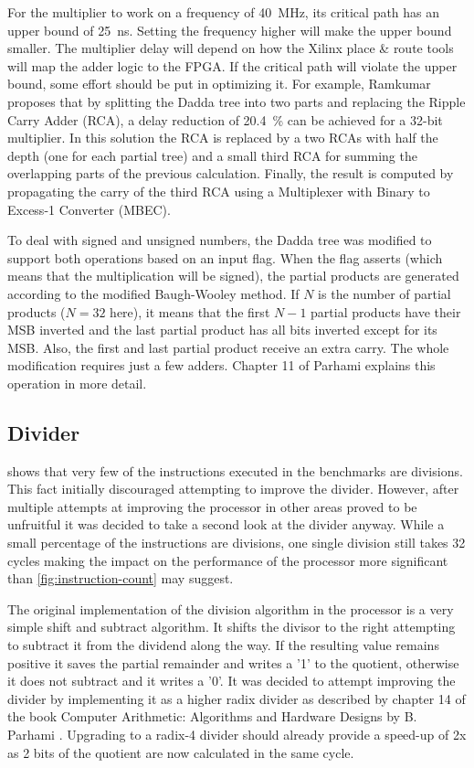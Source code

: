 \documentclass[final]{article}
\begin{document}
For the multiplier to work on a frequency of \SI{40}{\mega\hertz}, its critical path has an upper bound of \SI{25}{\nano\second}. Setting the frequency higher will make the upper bound smaller. The multiplier delay will depend on how the Xilinx place \& route tools will map the adder logic to the FPGA. If the critical path will violate the upper bound, some effort should be put in optimizing it. For example, Ramkumar \cite{ramkumar} proposes that by splitting the Dadda tree into two parts and replacing the Ripple Carry Adder (RCA), a delay reduction of \SI{20.4}{\percent} can be achieved for a 32-bit multiplier. In this solution the RCA is replaced by a two RCAs with half the depth (one for each partial tree) and a small third RCA for summing the overlapping parts of the previous calculation. Finally, the result is computed by propagating the carry of the third RCA using a Multiplexer with Binary to Excess-1 Converter (MBEC).

To deal with signed and unsigned numbers, the Dadda tree was modified to support both operations based on an input flag. When the flag asserts (which means that the multiplication will be signed), the partial products are generated according to the modified Baugh-Wooley method. If $N$ is the number of partial products ($N=32$ here), it means that the first $N-1$ partial products have their MSB inverted and the last partial product has all bits inverted except for its MSB. Also, the first and last partial product receive an extra carry. The whole modification requires just a few adders. Chapter 11 of Parhami \cite{parhami} explains this operation in more detail.

\subsection{Divider}
 shows that very few of the instructions executed in the benchmarks are divisions. This fact initially discouraged attempting to improve the divider. However, after multiple attempts at improving the processor in other areas proved to be unfruitful it was decided to take a second look at the divider anyway. While a small percentage of the instructions are divisions, one single division still takes 32 cycles making the impact on the performance of the processor more significant than \cref{fig:instruction-count} may suggest. 

The original implementation of the division algorithm in the processor is a very simple shift and subtract algorithm. It shifts the divisor to the right attempting to subtract it from the dividend along the way. If the resulting value remains positive it saves the partial remainder and writes a '1' to the quotient, otherwise it does not subtract and it writes a '0'. It was decided to attempt improving the divider by implementing it as a higher radix divider as described by chapter 14 of the book Computer Arithmetic: Algorithms and Hardware Designs by B. Parhami \cite{parhami}. Upgrading to a radix-4 divider should already provide a speed-up of 2x as 2 bits of the quotient are now calculated in the same cycle.
\end{document}
